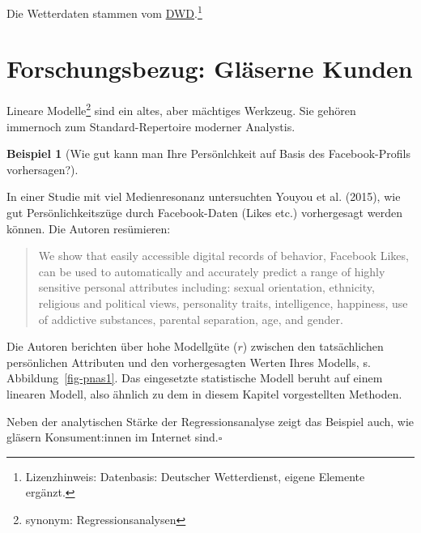 \documentclass[
  a4paper,
]{scrbook}
\theoremstyle{definition}
\newtheorem{example}{Beispiel}[chapter]
\theoremstyle{definition}
\theoremstyle{definition}
\theoremstyle{remark}
\begin{document}
Die Wetterdaten stammen vom
\href{https://opendata.dwd.de/}{DWD}.\footnote{Lizenzhinweis:
  Datenbasis: Deutscher Wetterdienst, eigene Elemente ergänzt.}

\section{Forschungsbezug: Gläserne
Kunden}\label{forschungsbezug-gluxe4serne-kunden}

Lineare Modelle\footnote{synonym: Regressionsanalysen} sind ein altes,
aber mächtiges Werkzeug. Sie gehören immernoch zum Standard-Repertoire
moderner Analystis.

\begin{example}[Wie gut kann man Ihre Persönlchkeit auf Basis des
Facebook-Profils
vorhersagen?]\protect\hypertarget{exm-kosinski}{}\label{exm-kosinski}

In einer Studie mit viel Medienresonanz untersuchten Youyou et al.
(2015), wie gut Persönlichkeitszüge durch Facebook-Daten (Likes etc.)
vorhergesagt werden können. Die Autoren resümieren:

\begin{quote}
We show that easily accessible digital records of behavior, Facebook
Likes, can be used to automatically and accurately predict a range of
highly sensitive personal attributes including: sexual orientation,
ethnicity, religious and political views, personality traits,
intelligence, happiness, use of addictive substances, parental
separation, age, and gender.
\end{quote}

Die Autoren berichten über hohe Modellgüte (\(r\)) zwischen den
tatsächlichen persönlichen Attributen und den vorhergesagten Werten
Ihres Modells, s. Abbildung~\ref{fig-pnas1}. Das eingesetzte
statistische Modell beruht auf einem linearen Modell, also ähnlich zu
dem in diesem Kapitel vorgestellten Methoden.

Neben der analytischen Stärke der Regressionsanalyse zeigt das Beispiel
auch, wie gläsern Konsument:innen im Internet sind.\(\square\)

\end{example}
\end{document}
